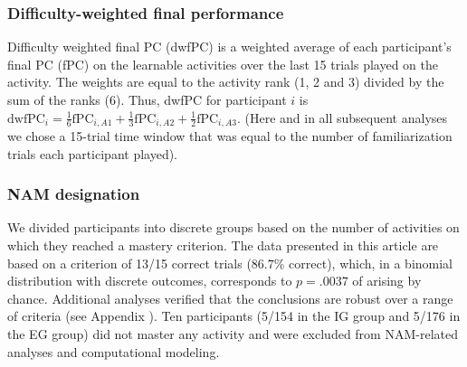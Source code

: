 \subsubsection{Difficulty-weighted final performance}\label{CH4_SSS_difficulty_weighted_final_performance}
Difficulty weighted final \ac{PC} (\ac{dwfPC}) is a weighted average of each participant’s final \ac{PC} (fPC) on the learnable activities over the last 15 trials played on the activity. The weights are equal to the activity rank (1, 2 and 3) divided by the sum of the ranks (6). Thus, \ac{dwfPC} for participant $i$ is $\text{dwfPC}_i = \frac{1}{6}\text{fPC}_{i,A1} + \frac{1}{3}\text{fPC}_{i,A2} + \frac{1}{2}\text{fPC}_{i,A3}$. (Here and in all subsequent analyses we chose a 15-trial time window that was equal to the number of familiarization trials each participant played).
 
\subsubsection{\ac{NAM} designation}\label{CH4_SSS_nam_designation}
We divided participants into discrete groups based on the number of activities on which they reached a mastery criterion. The data presented in this article are based on a criterion of 13/15 correct trials ($86.7\%$ correct), which, in a binomial distribution with discrete outcomes, corresponds to $p = .0037$ of arising by chance. Additional analyses verified that the conclusions are robust over a range of criteria (see Appendix ). Ten participants (5/154 in the \ac{IG} group and 5/176 in the \ac{EG} group) did not master any activity and were excluded from \ac{NAM}-related analyses and computational modeling.
 
